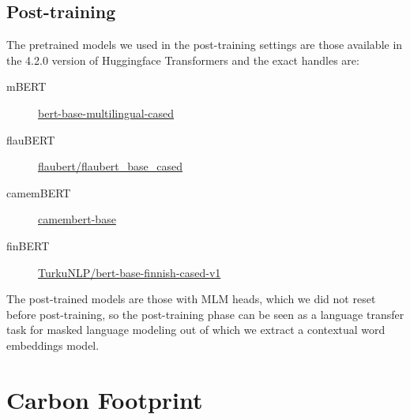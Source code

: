 \subsection{Post-training}

The pretrained models we used in the post-training settings are those available in the 4.2.0 version of Huggingface Transformers \citep{wolf-etal-2020-transformers} and the exact handles are:

\begin{description}
    \item[mBERT] \href{https://huggingface.co/bert-base-multilingual-cased}{bert-base-multilingual-cased}
    \item[flauBERT] \href{https://huggingface.co/flaubert/flaubert_base_cased}{flaubert/flaubert\_base\_cased}
    \item[camemBERT] \href{https://huggingface.co/camembert-base}{camembert-base}
    \item[finBERT] \href{https://huggingface.co/TurkuNLP/bert-base-finnish-cased-v1}{TurkuNLP/bert-base-finnish-cased-v1}
\end{description}

The post-trained models are those with MLM heads, which we did not reset before post-training, so the post-training phase can be seen as a language transfer task for masked language modeling out of which we extract a contextual word embeddings model.

\section{Carbon Footprint}\label{carbon-footprint}

\begin{table}[t]
    \centering\small
    \caption{Average power draw (Watts), number of models trained, training times in hours, mean power consumption (kWh) and CO\textsubscript{2} emissions (kg); for each setting.}
    \label{tab:carbon-bertrade}
\end{table}

